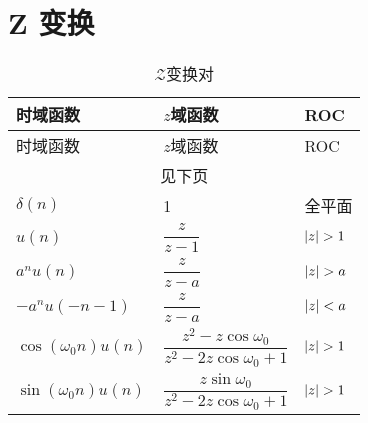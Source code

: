 \documentclass[cn,11pt,chinese,black,simple]{elegantbook}
\begin{document}
\section{Z 变换}


\begin{longtable}{lll} 
    \caption{\(\mathscr{Z}\)变换对} \\ 
    \toprule
    时域函数 & \(z\)域函数 & ROC \\
    \midrule
    \endfirsthead
    
    \toprule
    时域函数 & \(z\)域函数 & ROC \\
    \midrule
    \endhead 
  
    \hline
    \multicolumn{3}{c}{见下页}\\   \bottomrule
    \endfoot
  
    \bottomrule
    \endlastfoot
    \(\delta(n)\) & 1 & 全平面\\
    \(u(n)\) & \(\dfrac{z}{z-1}\) & \(\abs{z}>1\) \\
    \(a^n u(n)\) & \(\dfrac{z}{z-a}\) & \(\abs{z}>a\) \\
    \(-a^n u(-n-1)\) & \(\dfrac{z}{z-a}\) & \(\left| z \right|<a\)\\
    \(\cos(\omega_0 n)u(n)\) & \(\dfrac{z^2-z \cos \omega_0}{z^2 - 2 z \cos\omega_0 + 1}\) & \(\abs{z}>1\) \\
    \(\sin(\omega_0 n)u(n)\) & \(\dfrac{z \sin\omega_0}{z^2 -2 z \cos\omega_0 + 1}\) &  \(\abs{z}>1\) \\

\end{longtable}
  
\end{document}

